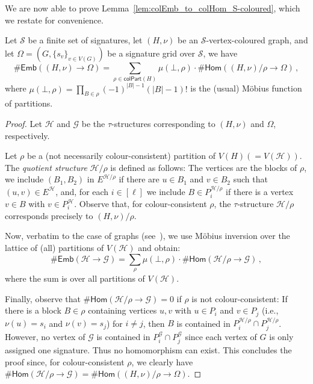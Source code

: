 \documentclass[authorcolumns,numberwithinsect]{no-lipics-v2022}
\newcommand{\homs}[2]{\mathsf{Hom}(#1 \to #2)}
\newcommand{\embs}[2]{\mathsf{Emb}(#1 \to #2)}
\begin{document}
We are now able to prove Lemma~\ref{lem:colEmb_to_colHom_S-coloured}, which we restate for convenience.
\begin{lemma}
      Let $\mathcal{S}$ be a finite set of signatures, let $(H,\nu)$ be an $\mathcal{S}$-vertex-coloured graph, and let $\Omega=(G,\{s_v\}_{v\in V(G)})$ be a signature grid over $\mathcal{S}$, we have
    \[ \#\embs{(H,\nu)}{\Omega} = \sum_{\rho \in \mathsf{colPart}(H)} \mu(\bot,\rho)\cdot \#\homs{(H,\nu)/\rho}{\Omega}\,,\]
    where $\mu(\bot,\rho)=\prod_{B\in \rho}(-1)^{|B|-1}(|B|-1)!$ is the (usual) M\"obius function of partitions.
\end{lemma}
\begin{proof}
    Let $\mathcal{H}$ and $\mathcal{G}$ be the $\tau$-structures corresponding to $(H,\nu)$ and $\Omega$, respectively.

    Let $\rho$ be a (not necessarily colour-consistent) partition of $V(H) (=V(\mathcal{H}))$. The \emph{quotient structure} $\mathcal{H}/\rho$ is defined as follows: The vertices are the blocks of $\rho$, we include $(B_1,B_2)$ in $E^{\mathcal{H}/\rho}$ if there are $u\in B_1$ and $v\in B_2$ such that $(u,v)\in E^\mathcal{H}$, and, for each $i\in[\ell]$ we include $B \in P^{\mathcal{H}/\rho}_i$ if there is a vertex $v\in B$ with $v\in P_i^\mathcal{H}$. Observe that, for colour-consistent $\rho$, the $\tau$-structure $\mathcal{H}/\rho$ corresponds precisely to $(H,\nu)/\rho$.

    Now, verbatim to the case of graphs (see~\cite[(5.18)]{Lovasz12}), we use M\"obius inversion over the lattice of (all) partitions of $V(\mathcal{H})$ and obtain:
    \[\#\embs{\mathcal{H}}{\mathcal{G}}=\sum_{\rho} \mu(\bot,\rho) \cdot \#\homs{\mathcal{H}/\rho}{\mathcal{G}} \,,\]
    where the sum is over all partitions of $V(\mathcal{H})$.

    Finally, observe that $\#\homs{\mathcal{H}/\rho}{\mathcal{G}}=0$ if $\rho$ is not colour-consistent: If there is a block $B\in \rho$ containing vertices $u,v$ with $u\in P_i$ and $v\in P_j$ (i.e., $\nu(u)=s_i$ and $\nu(v)=s_j$) for $i\neq j$, then $B$ is contained in $P_i^{\mathcal{H}/\rho}\cap P_j^{\mathcal{H}/\rho}$. However, no vertex of $\mathcal{G}$ is contained in $P_i^{\mathcal{G}}\cap P_j^{\mathcal{G}}$ since each vertex of $G$ is only assigned one signature. Thus no homomorphism can exist. This concludes the proof since, for colour-consistent $\rho$, we clearly have $\#\homs{\mathcal{H}/\rho}{\mathcal{G}}=\#\homs{(H,\nu)/\rho}{\Omega}$.
\end{proof}
\end{document}
